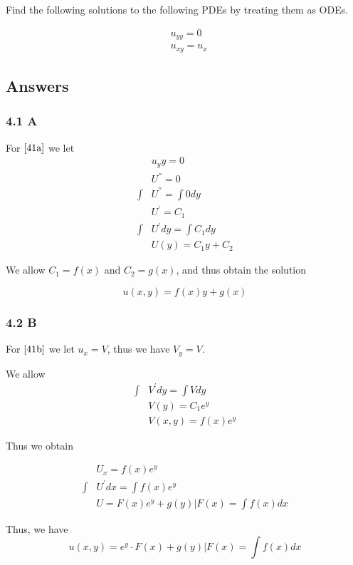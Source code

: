 \documentclass{article}
\begin{document}
Find the following solutions to the following PDEs by treating them as ODEs.

\begin{align}
&u_{yy}=0 \label{41a} \\
&u_{xy}=u_x \label{41b}
\end{align}

\subsection*{Answers}

\subsubsection*{4.1 A}

For $\eqref{41a}$ we let
\begin{align*}
&u_yy=0 \\
&U^{''} = 0\\
\int &U^{''} = \int 0 dy \\
&U^{'} = C_1 \\
\int &U^{'} dy = \int C_1 dy \\
&U(y) = C_1y + C_2
\end{align*}

We allow $C_1 = f(x)$ and $C_2 = g(x)$, and thus obtain the solution

$$ u(x,y) = f(x)y + g(x) $$

\subsubsection*{4.2 B}

For $\eqref{41b}$ we let $u_x = V$, thus we have $V_y = V$.

We allow
\begin{align*}
\int &V^{'} dy = \int V dy \\
&V\left(y\right) = C_1 e^{y} \\
&V\left(x,y\right) = f(x) e^{y}
\end{align*}

Thus we obtain

\begin{align*}
&U_x = f(x) e^{y} \\
\int &U^{'} dx = \int f(x) e^{y} \\
&U = F\left(x\right) e^{y} + g\left(y\right)\Bigr| F\left(x\right) = \int f\left(x\right) dx
\end{align*}

Thus, we have
$$u(x,y) = e^{y} \cdot F(x) + g(y)\Bigr| F\left(x\right) = \int f\left(x\right) dx$$
\end{document}
